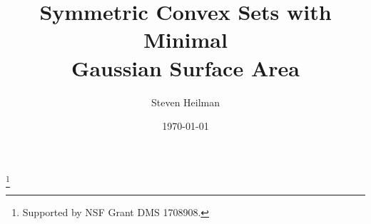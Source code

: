 \documentclass[12pt,reqno]{amsart}
\theoremstyle{definition}
\begin{document}
\title{Symmetric Convex Sets with Minimal\\ Gaussian Surface Area}

\author{Steven Heilman}
\address{Department of Mathematics, UCLA, Los Angeles, CA 90095-1555}
\date{\today}
\thanks{Supported by NSF Grant DMS 1708908.}

%
\end{document}
